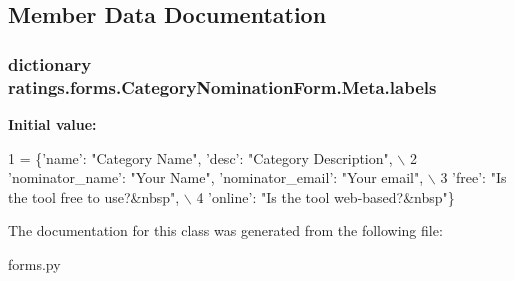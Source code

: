 \subsection{Member Data Documentation}
\hypertarget{classratings_1_1forms_1_1CategoryNominationForm_1_1Meta_afe382d7e6bbec1613ca42e1a0897ae48}{
\subsubsection[{labels}]{\setlength{\rightskip}{0pt plus 5cm}dictionary ratings.\-forms.\-Category\-Nomination\-Form.\-Meta.\-labels\hspace{0.3cm}{\ttfamily [static]}}}\label{classratings_1_1forms_1_1CategoryNominationForm_1_1Meta_afe382d7e6bbec1613ca42e1a0897ae48}
{\bfseries Initial value\-:}
\begin{DoxyCode}
1 = \{\textcolor{stringliteral}{'name'}: \textcolor{stringliteral}{"Category Name"}, \textcolor{stringliteral}{'desc'}: \textcolor{stringliteral}{"Category Description"}, \(\backslash\)
2             \textcolor{stringliteral}{'nominator\_name'}: \textcolor{stringliteral}{"Your Name"}, \textcolor{stringliteral}{'nominator\_email'}: \textcolor{stringliteral}{"Your email"}, \(\backslash\)
3             \textcolor{stringliteral}{'free'}: \textcolor{stringliteral}{"Is the tool free to use?&nbsp"}, \(\backslash\)
4             \textcolor{stringliteral}{'online'}: \textcolor{stringliteral}{"Is the tool web-based?&nbsp"}\}
\end{DoxyCode}


The documentation for this class was generated from the following file\-:\begin{DoxyCompactItemize}
\item 
forms.\-py\end{DoxyCompactItemize}
